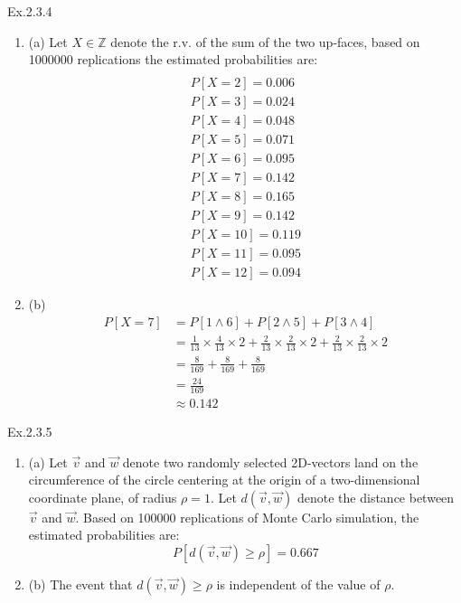 \documentclass[11pt]{article}
\theoremstyle{definition}
\begin{document}
\begin{enumerate}[leftmargin=0pt, itemsep=3ex]
    \problemitem Ex.2.3.4
        \begin{enumerate}
        \item (a)
        Let $X \in \mathbb{Z}$ denote the r.v. of the sum of the two up-faces,
        based on 1000000 replications the estimated probabilities are:
        \begin{align*}
        \\P[X=2] = 0.006
        \\P[X=3] = 0.024
        \\P[X=4] = 0.048
        \\P[X=5] = 0.071
        \\P[X=6] = 0.095
        \\P[X=7] = 0.142
        \\P[X=8] = 0.165
        \\P[X=9] = 0.142
        \\P[X=10] = 0.119
        \\P[X=11] = 0.095
        \\P[X=12] = 0.094
        \end{align*}
        \item (b)
        \begin{align*}
            P[X=7] &= P[1 \land 6]+P[2 \land 5]+P[3 \land 4]
             \\ &= \frac{1}{13}\times \frac{4}{13} \times 2 + \frac{2}{13}\times \frac{2}{13} \times 2 + \frac{2}{13}\times \frac{2}{13} \times 2 
             \\ &= \frac{8}{169} + \frac{8}{169} + \frac{8}{169}
             \\ &= \frac{24}{169}
             \\ & \approx 0.142
        \end{align*}
        \end{enumerate}

    \problemitem Ex.2.3.5
    
        \begin{enumerate}
            \item (a) Let $\overrightarrow{v}$ and $\overrightarrow{w}$ denote two randomly selected 2D-vectors land on the circumference of the circle centering at the origin of a two-dimensional coordinate plane, of radius $\rho = 1$.
            Let $d(\overrightarrow{v},\overrightarrow{w})$ denote the distance between $\overrightarrow{v}$ and $\overrightarrow{w}$.
    Based on 100000 replications of Monte Carlo simulation, the estimated probabilities are:
    $$P[d(\overrightarrow{v},\overrightarrow{w}) \geqslant \rho] = 0.667$$
    \item (b) The event that $d(\overrightarrow{v},\overrightarrow{w}) \geqslant \rho$ is independent of the value of $\rho$.
        \end{enumerate}
        
\end{enumerate}
\end{document}
